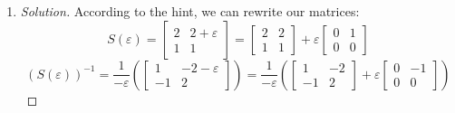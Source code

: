 \documentclass{article}
\newcommand{\N}{{\mathbb N}}
\newcommand{\ep}{{\varepsilon}}
\begin{document}
\begin{enumerate}
\begin{proof}[Solution]
		We now derive a formula for $x_n$ in terms of $x_0,x_1$.
		Note that $\mathbf{y}_0 = \begin{bmatrix} x_1 \\ x_0 \end{bmatrix}$.
		It is clear that $\mathbf{y}_n = A^n\mathbf{y}_0$ for all $n \in \N_0$:
		$\mathbf{y}_0 = A^0\mathbf{y}_0 = I\mathbf{y}_0$,
		and if we assume $\mathbf{y}_n = A^n\mathbf{y}_0$,
		then $\mathbf{y}_{n+1} = A\mathbf{y}_n = A^{n+1}\mathbf{y}_0$
		by the definition of $A$,
		closing the induction.
		Thus, we have
		\[
			\begin{bmatrix} x_{n+1} \\ x_n \end{bmatrix} = \mathbf{y}_n
			= A^n\mathbf{y}_0
			= \begin{bmatrix} (1+n)2^n & -n\cdot 2^{n+1} \\ n \cdot 2^{n-1} & (1-n)2^n \end{bmatrix}
			\begin{bmatrix} x_1 \\ x_0 \end{bmatrix}
		\]
		Looking only at the bottom row, we get the explicit formula
		\[
			x_n = (n\cdot 2^{n-1})x_1 + ((1-n)2^n)x_0
		\]
		One can actually check that this matches the formula from part (a),
		but this is not required of me.
	\end{proof}
	\item \begin{proof}[Solution]\let\qed\relax
		According to the hint, we can rewrite our matrices:
		\[
			S(\ep) = \begin{bmatrix} 2 & 2+ \ep \\ 1 & 1 \end{bmatrix}
			= \begin{bmatrix} 2 & 2 \\ 1 & 1 \end{bmatrix}
			+ \ep \begin{bmatrix} 0 & 1 \\ 0 & 0 \end{bmatrix}
		\]
		\[
			(S(\ep))^{-1} = \frac{1}{-\ep}
			\left(\begin{bmatrix} 1 & -2-\ep \\ -1 & 2 \end{bmatrix}\right)
			= \frac{1}{-\ep}\left(\begin{bmatrix} 1 & -2 \\ -1 & 2 \end{bmatrix}
			+ \ep \begin{bmatrix} 0 & -1 \\ 0 & 0 \end{bmatrix}\right)
\]
\end{proof}
\end{enumerate}
\end{document}
